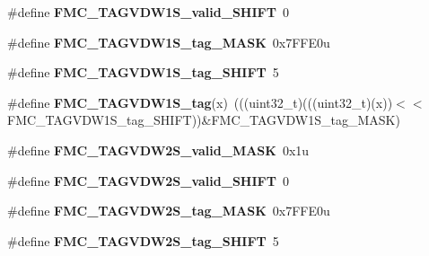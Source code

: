 \begin{DoxyCompactItemize}
\item 
\#define {\bfseries F\+M\+C\+\_\+\+T\+A\+G\+V\+D\+W1\+S\+\_\+valid\+\_\+\+S\+H\+I\+FT}~0\hypertarget{group__FMC__Register__Masks_ga2399e43fc56c8c9765ee4b259064eca0}{}\label{group__FMC__Register__Masks_ga2399e43fc56c8c9765ee4b259064eca0}

\item 
\#define {\bfseries F\+M\+C\+\_\+\+T\+A\+G\+V\+D\+W1\+S\+\_\+tag\+\_\+\+M\+A\+SK}~0x7\+F\+F\+E0u\hypertarget{group__FMC__Register__Masks_ga45f190c0d7ee9c842a0e5f5bedd047d1}{}\label{group__FMC__Register__Masks_ga45f190c0d7ee9c842a0e5f5bedd047d1}

\item 
\#define {\bfseries F\+M\+C\+\_\+\+T\+A\+G\+V\+D\+W1\+S\+\_\+tag\+\_\+\+S\+H\+I\+FT}~5\hypertarget{group__FMC__Register__Masks_ga796e1287dc06a1ccce8dde2de6ec177e}{}\label{group__FMC__Register__Masks_ga796e1287dc06a1ccce8dde2de6ec177e}

\item 
\#define {\bfseries F\+M\+C\+\_\+\+T\+A\+G\+V\+D\+W1\+S\+\_\+tag}(x)~(((uint32\+\_\+t)(((uint32\+\_\+t)(x))$<$$<$F\+M\+C\+\_\+\+T\+A\+G\+V\+D\+W1\+S\+\_\+tag\+\_\+\+S\+H\+I\+FT))\&F\+M\+C\+\_\+\+T\+A\+G\+V\+D\+W1\+S\+\_\+tag\+\_\+\+M\+A\+SK)\hypertarget{group__FMC__Register__Masks_gaee2594ff5f366b6b15fbf97934a7096b}{}\label{group__FMC__Register__Masks_gaee2594ff5f366b6b15fbf97934a7096b}

\item 
\#define {\bfseries F\+M\+C\+\_\+\+T\+A\+G\+V\+D\+W2\+S\+\_\+valid\+\_\+\+M\+A\+SK}~0x1u\hypertarget{group__FMC__Register__Masks_ga9a9bd5d3c2ddb39468a566b7b33a67af}{}\label{group__FMC__Register__Masks_ga9a9bd5d3c2ddb39468a566b7b33a67af}

\item 
\#define {\bfseries F\+M\+C\+\_\+\+T\+A\+G\+V\+D\+W2\+S\+\_\+valid\+\_\+\+S\+H\+I\+FT}~0\hypertarget{group__FMC__Register__Masks_ga7114b81f80486097779a48dbcf61574f}{}\label{group__FMC__Register__Masks_ga7114b81f80486097779a48dbcf61574f}

\item 
\#define {\bfseries F\+M\+C\+\_\+\+T\+A\+G\+V\+D\+W2\+S\+\_\+tag\+\_\+\+M\+A\+SK}~0x7\+F\+F\+E0u\hypertarget{group__FMC__Register__Masks_gae2165ed5443bbd561078fa2ff8bf30e5}{}\label{group__FMC__Register__Masks_gae2165ed5443bbd561078fa2ff8bf30e5}

\item 
\#define {\bfseries F\+M\+C\+\_\+\+T\+A\+G\+V\+D\+W2\+S\+\_\+tag\+\_\+\+S\+H\+I\+FT}~5\hypertarget{group__FMC__Register__Masks_ga5e8d91c514d82c1ce5419cf5120ba178}{}\label{group__FMC__Register__Masks_ga5e8d91c514d82c1ce5419cf5120ba178}


\end{DoxyCompactItemize}
